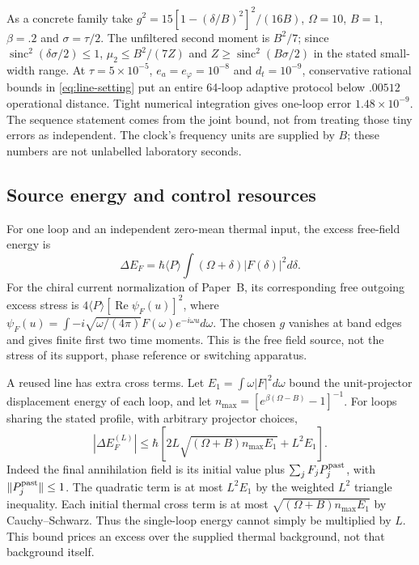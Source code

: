 As a concrete family take
$g^2=15[1-(\delta/B)^2]^2/(16B)$, $\Omega=10$, $B=1$,
$\beta=.2$ and $\sigma=\tau/2$. The unfiltered second moment is
$B^2/7$; since $\operatorname{sinc}^2(\delta\sigma/2)\le1$,
$\mu_2\le B^2/(7Z)$ and
$Z\ge\operatorname{sinc}^2(B\sigma/2)$ in the stated small-width range.
At $\tau=5\times10^{-5}$, $e_a=e_\varphi=10^{-8}$ and
$d_t=10^{-9}$, conservative rational bounds in
\eqref{eq:line-setting} put an entire 64-loop adaptive protocol below
$.00512$ operational distance. Tight numerical integration gives
one-loop error $1.48\times10^{-9}$. The sequence statement comes
from the joint bound, not from treating those tiny errors as independent.
The clock's frequency units are supplied by $B$; these numbers are not
unlabelled laboratory seconds.

\subsection{Source energy and control resources}

For one loop and an independent zero-mean thermal input, the excess
free-field energy is
\begin{equation}\label{eq:line-energy}
 \Delta E_F=\hbar\langle P\rangle
       \int(\Omega+\delta)|F(\delta)|^2d\delta .
\end{equation}
For the chiral current normalization of Paper~B, its corresponding
free outgoing excess stress is $4\langle P\rangle[\operatorname{Re}
\psi_F(u)]^2$, where
$\psi_F(u)=\int-i\sqrt{\omega/(4\pi)}F(\omega)e^{-i\omega u}d\omega$.
The chosen $g$ vanishes at band edges and gives finite first two time
moments. This is the free field source, not the stress of its support,
phase reference or switching apparatus.

A reused line has extra cross terms. Let
$E_1=\int\omega|F|^2d\omega$ bound the unit-projector displacement
energy of each loop, and let
$n_{\max}=[e^{\beta(\Omega-B)}-1]^{-1}$.
For loops sharing the stated profile, with arbitrary projector choices,
\begin{equation}\label{eq:line-multienergy}
 |\Delta E_F^{(L)}|
 \le\hbar\left[2L\sqrt{(\Omega+B)n_{\max}E_1}+L^2E_1\right].
\end{equation}
Indeed the final annihilation field is its initial value plus
$\sum_jF_jP_j^{\rm past}$, with $\|P_j^{\rm past}\|\le1$.
The quadratic term is at most $L^2E_1$ by the weighted $L^2$ triangle
inequality. Each initial thermal cross term is at most
$\sqrt{(\Omega+B)n_{\max}E_1}$ by Cauchy--Schwarz. Thus the single-loop
energy cannot simply be multiplied by $L$. This bound prices an
excess over the supplied thermal background, not that background itself.

